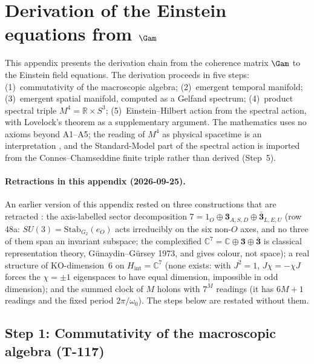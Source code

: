 
\section{Derivation of the Einstein equations from $\Gam$}
\label{app:einstein}

This appendix presents the derivation chain from the coherence matrix $\Gam$ to the
Einstein field equations. The derivation proceeds in five steps: (1)~commutativity of the
macroscopic algebra; (2)~emergent temporal manifold; (3)~emergent spatial manifold,
computed as a Gelfand spectrum; (4)~product spectral triple $M^4 = \mathbb{R} \times S^3$;
(5)~Einstein--Hilbert action from the spectral action, with Lovelock's theorem as a
supplementary argument. The mathematics uses no axioms beyond A1--A5; the reading of
$M^4$ as physical spacetime is an interpretation , and the Standard-Model part
of the spectral action is imported from the Connes--Chamseddine finite triple rather than
derived (Step~5).

\paragraph{Retractions in this appendix (2026-09-25).} An earlier version of this appendix
rested on three constructions that are retracted \status{$\times$}: the axis-labelled
sector decomposition $7 = 1_O \oplus \mathbf{3}_{A,S,D} \oplus \bar{\mathbf{3}}_{L,E,U}$
(row 48a: $SU(3) = \mathrm{Stab}_{G_2}(e_O)$ acts irreducibly on the six non-$O$ axes, and
no three of them span an invariant subspace; the complexified
$\mathbb{C}^7 = \mathbb{C} \oplus \mathbf{3} \oplus \bar{\mathbf{3}}$ is classical
representation theory, G\"unaydin--G\"ursey 1973, and gives colour, not space); a real
structure of KO-dimension~6 on $H_{\mathrm{int}} = \mathbb{C}^7$ (none exists: with
$J^2 = 1$, $J\chi = -\chi J$ forces the $\chi = \pm 1$ eigenspaces to have equal
dimension, impossible in odd dimension); and the summed clock of $M$ holons with
$7^M$ readings (it has $6M+1$ readings and the fixed period $2\pi/\omega_0$). The steps
below are restated without them.

\subsection{Step 1: Commutativity of the macroscopic algebra (T-117)}

